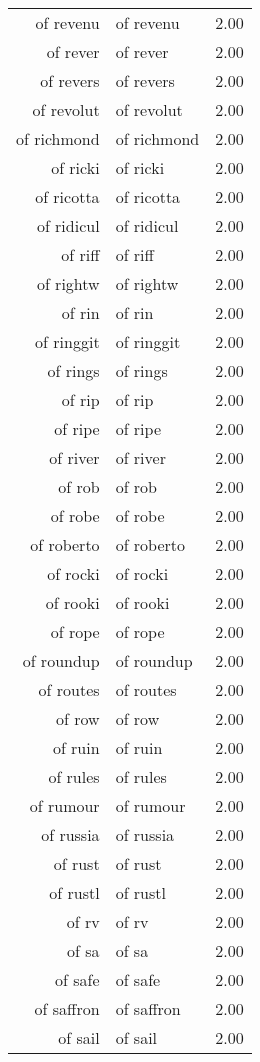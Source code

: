 \begin{table}[ht]
\begin{tabular}{rlr}
  of revenu & of revenu & 2.00 \\ 
  of rever & of rever & 2.00 \\ 
  of revers & of revers & 2.00 \\ 
  of revolut & of revolut & 2.00 \\ 
  of richmond & of richmond & 2.00 \\ 
  of ricki & of ricki & 2.00 \\ 
  of ricotta & of ricotta & 2.00 \\ 
  of ridicul & of ridicul & 2.00 \\ 
  of riff & of riff & 2.00 \\ 
  of rightw & of rightw & 2.00 \\ 
  of rin & of rin & 2.00 \\ 
  of ringgit & of ringgit & 2.00 \\ 
  of rings & of rings & 2.00 \\ 
  of rip & of rip & 2.00 \\ 
  of ripe & of ripe & 2.00 \\ 
  of river & of river & 2.00 \\ 
  of rob & of rob & 2.00 \\ 
  of robe & of robe & 2.00 \\ 
  of roberto & of roberto & 2.00 \\ 
  of rocki & of rocki & 2.00 \\ 
  of rooki & of rooki & 2.00 \\ 
  of rope & of rope & 2.00 \\ 
  of roundup & of roundup & 2.00 \\ 
  of routes & of routes & 2.00 \\ 
  of row & of row & 2.00 \\ 
  of ruin & of ruin & 2.00 \\ 
  of rules & of rules & 2.00 \\ 
  of rumour & of rumour & 2.00 \\ 
  of russia & of russia & 2.00 \\ 
  of rust & of rust & 2.00 \\ 
  of rustl & of rustl & 2.00 \\ 
  of rv & of rv & 2.00 \\ 
  of sa & of sa & 2.00 \\ 
  of safe & of safe & 2.00 \\ 
  of saffron & of saffron & 2.00 \\ 
  of sail & of sail & 2.00 \\ 

\end{tabular}
\end{table}
